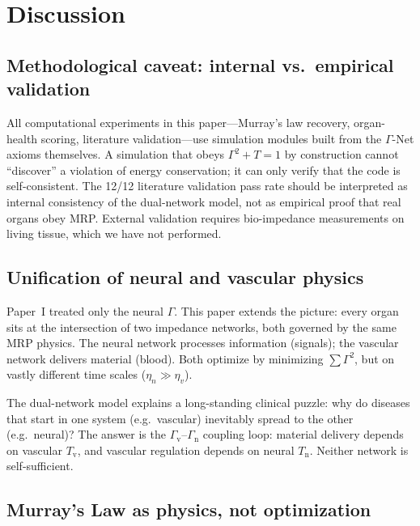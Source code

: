 ﻿\documentclass[aps,pre,twocolumn,superscriptaddress,floatfix]{revtex4-2}
\newcommand{\Gv}{\Gamma_{\mathrm{v}}}
\newcommand{\Gn}{\Gamma_{\mathrm{n}}}
\newcommand{\Tv}{T_{\mathrm{v}}}
\newcommand{\Tn}{T_{\mathrm{n}}}
\begin{document}
\section{Discussion}\label{sec:discussion}

\subsection{Methodological caveat: internal vs.\ empirical validation}

All computational experiments in this paper---Murray's law recovery,
organ-health scoring, literature validation---use simulation modules
built from the $\Gamma$-Net axioms themselves.
A simulation that obeys $\Gamma^2+T=1$ by construction cannot
``discover'' a violation of energy conservation; it can only verify
that the code is self-consistent.
The 12/12 literature validation pass rate should be interpreted
as internal consistency of the dual-network model, not as
empirical proof that real organs obey MRP.
External validation requires bio-impedance measurements on living
tissue, which we have not performed.

\subsection{Unification of neural and vascular physics}

Paper~I treated only the neural $\Gamma$.
This paper extends the picture: every organ sits at
the intersection of two impedance networks, both governed
by the same MRP physics.
The neural network processes information (signals);
the vascular network delivers material (blood).
Both optimize by minimizing $\sum \Gamma^2$, but on
vastly different time scales ($\eta_n \gg \eta_v$).

The dual-network model explains a long-standing clinical
puzzle: why do diseases that start in one system
(e.g.\ vascular) inevitably spread to the other
(e.g.\ neural)?
The answer is the $\Gv$--$\Gn$ coupling loop:
material delivery depends on vascular $\Tv$,
and vascular regulation depends on neural $\Tn$.
Neither network is self-sufficient.


\subsection{Murray's Law as physics, not optimization}
\end{document}
